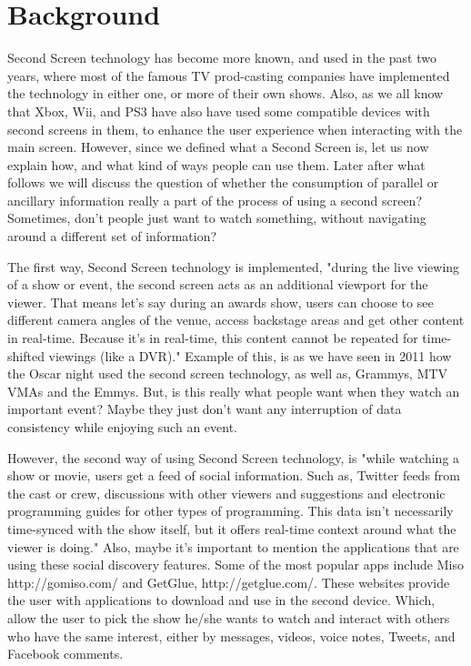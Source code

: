 \documentclass[12pt, oneside]{amsart}   	%
\begin{document}
 \section{Background}

 Second Screen technology has become more known, and used in the past two years, where most of the famous TV prod-casting companies have implemented the technology in either one, or more of their own shows.  Also, as we all know that Xbox, Wii, and PS3 have also have used some compatible devices with second screens in them, to enhance the user experience when interacting with the main screen.
 However, since we defined what a Second Screen is, let us now explain how, and what kind of ways people can use them.  Later after what follows we will discuss the question of whether the consumption of parallel or ancillary information really a part of the process of using a second screen? Sometimes, don't people just want to watch something, without navigating around a different set of information?
 
 The first way, Second Screen technology is implemented, "during the live viewing of a show or event, the second screen acts as an additional viewport for the viewer. That means let's say during an awards show, users can choose to see different camera angles of the venue, access backstage areas and get other content in real-time. Because it's in real-time, this content cannot be repeated for time-shifted viewings (like a DVR)."\cite{Second-Screen-His} Example of this, is as we have seen in 2011 how the Oscar night used the second screen technology, as well as, Grammys, MTV VMAs and the Emmys.\cite{Second-Screen-His} But, is this really what people want when they watch an important event? Maybe they just don't want any interruption of data consistency while enjoying such an event.

However, the second way of using Second Screen technology, is "while watching a show or movie, users get a feed of social information. Such as, Twitter feeds from the cast or crew, discussions with other viewers and suggestions and electronic programming guides for other types of programming. This data isn't necessarily time-synced with the show itself, but it offers real-time context around what the viewer is doing."\cite{Second-Screen-His} Also, maybe it's important to mention the applications that are using these social discovery features. Some of the most popular apps include Miso http://gomiso.com/ and GetGlue, http://getglue.com/. \cite{Second-Screen-Art} These websites provide the user with applications to download and use in the second device.  Which, allow the user to pick the show he/she wants to watch and interact with others who have the same interest, either by messages, videos, voice notes, Tweets, and Facebook comments.
\end{document}
